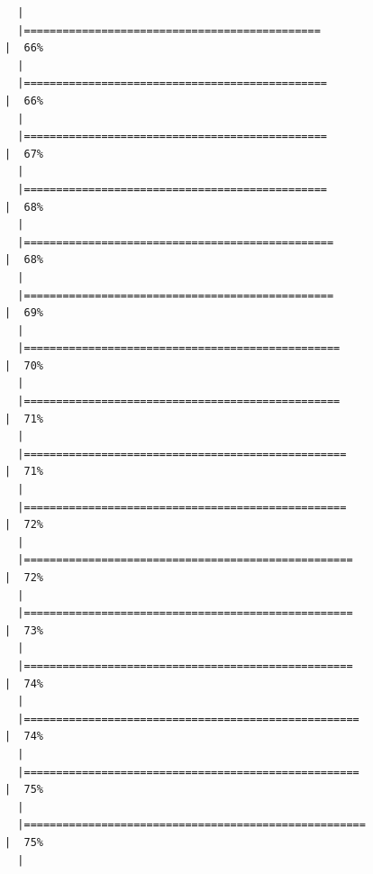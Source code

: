 \documentclass[
  letterpaper,
  DIV=11,
  numbers=noendperiod]{scrreprt}
\begin{document}
\begin{verbatim}
  |                                                                            
  |==============================================                        |  66%
  |                                                                            
  |===============================================                       |  66%
  |                                                                            
  |===============================================                       |  67%
  |                                                                            
  |===============================================                       |  68%
  |                                                                            
  |================================================                      |  68%
  |                                                                            
  |================================================                      |  69%
  |                                                                            
  |=================================================                     |  70%
  |                                                                            
  |=================================================                     |  71%
  |                                                                            
  |==================================================                    |  71%
  |                                                                            
  |==================================================                    |  72%
  |                                                                            
  |===================================================                   |  72%
  |                                                                            
  |===================================================                   |  73%
  |                                                                            
  |===================================================                   |  74%
  |                                                                            
  |====================================================                  |  74%
  |                                                                            
  |====================================================                  |  75%
  |                                                                            
  |=====================================================                 |  75%
  |                                                                            

\end{verbatim}
\end{document}
